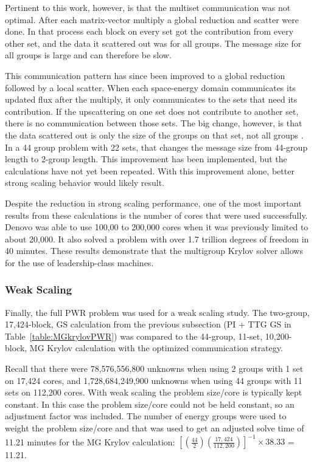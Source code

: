 Pertinent to this work, however, is that the multiset communication was not optimal. After each matrix-vector multiply a global reduction and scatter were done. In that process each block on every set got the contribution from every other set, and the data it scattered out was for all groups. The message size for all groups is large and can therefore be slow.

This communication pattern has since been improved to a global reduction followed by a local scatter. When each space-energy domain communicates its updated flux after the multiply, it only communicates to the sets that need its contribution. If the upscattering on one set does not contribute to another set, there is no communication between those sets. The big change, however, is that the data scattered out is only the size of the groups on that set, not all groups \cite{Evans2011b}. In a 44 group problem with 22 sets, that changes the message size from 44-group length to 2-group length. This improvement has been implemented, but the calculations have not yet been repeated. With this improvement alone, better strong scaling behavior would likely result. 

Despite the reduction in strong scaling performance, one of the most important results from these calculations is the number of cores that were used successfully. Denovo was able to use 100,00 to 200,000 cores when it was previously limited to about 20,000. It also solved a problem with over 1.7 trillion degrees of freedom in 40 minutes. These results demonstrate that the multigroup Krylov solver allows for the use of leadership-class machines.

\subsubsection{Weak Scaling}
Finally, the full PWR problem was used for a weak scaling study. The two-group, 17,424-block, GS calculation from the previous subsection (PI + TTG GS in Table~\ref{table:MGkrylovPWR}) was compared to the 44-group, 11-set, 10,200-block, MG Krylov calculation with the optimized communication strategy. 

Recall that there were 78,576,556,800 unknowns when using 2 groups with 1 set on 17,424 cores, and 1,728,684,249,900 unknowns when using 44 groups with 11 sets on 112,200 cores. With weak scaling the problem size/core is typically kept constant. In this case the problem size/core could not be held constant, so an adjustment factor was included. The number of energy groups were used to weight the problem size/core and that was used to get an adjusted solve time of 11.21 minutes for the MG Krylov calculation: $[(\frac{44}{2})(\frac{17,424}{112,200})]^{-1}\times38.33$ = 11.21. 

